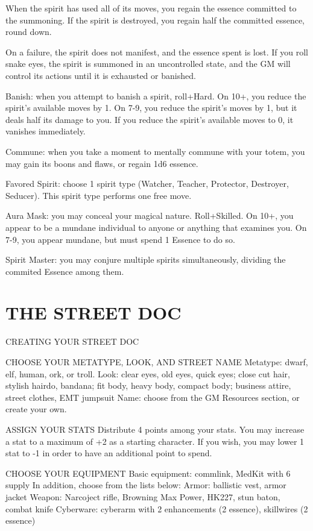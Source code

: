 When the spirit has used all of its moves, you regain the essence committed to the summoning. If the spirit is destroyed, you regain half the committed essence, round down.

On a failure, the spirit does not manifest, and the essence spent is lost. If you roll snake eyes, the spirit is summoned in an uncontrolled state, and the GM will control its actions until it is exhausted or banished.

Banish: when you attempt to banish a spirit, roll+Hard. On 10+, you reduce the spirit’s available moves by 1. On 7-9, you reduce the spirit’s moves by 1, but it deals half its damage to you. If you reduce the spirit’s available moves to 0, it vanishes immediately.

Commune: when you take a moment to mentally commune with your totem, you may gain its boons and flaws, or regain 1d6 essence.

Favored Spirit: choose 1 spirit type (Watcher, Teacher, Protector, Destroyer, Seducer). This spirit type performs one free move.

Aura Mask: you may conceal your magical nature. Roll+Skilled. On 10+, you appear to be a mundane individual to anyone or anything that examines you. On 7-9, you appear mundane, but must spend 1 Essence to do so.

Spirit Master: you may conjure multiple spirits simultaneously, dividing the commited Essence among them.



\clearpage
\section{THE STREET DOC}
CREATING YOUR STREET DOC

CHOOSE YOUR METATYPE, LOOK, AND STREET NAME
Metatype: dwarf, elf, human, ork, or troll.
Look: clear eyes, old eyes, quick eyes; close cut hair, stylish hairdo, bandana; fit body, heavy body, compact body; business attire, street clothes, EMT jumpsuit
Name: choose from the GM Resources section, or create your own.

ASSIGN YOUR STATS
Distribute 4 points among your stats. You may increase a stat to a maximum of +2 as a starting character. If you wish, you may lower 1 stat to -1 in order to have an additional point to spend.

CHOOSE YOUR EQUIPMENT
Basic equipment: commlink, MedKit with 6 supply
In addition, choose from the lists below:
Armor: ballistic vest, armor jacket
Weapon: Narcoject rifle, Browning Max Power, HK227, stun baton, combat knife
Cyberware: cyberarm with 2 enhancements (2 essence), skillwires (2 essence)


